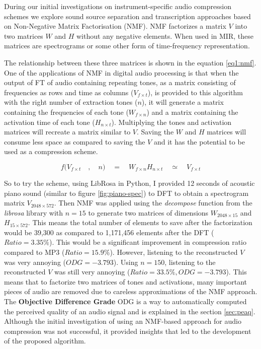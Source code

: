 During our initial investigations on instrument-specific audio compression schemes we explore sound source 
separation and transcription approaches based on Non-Negative Matrix Factorisation (NMF). NMF factorizes a matrix $V$ into two matrices $W$ and $H$ without any negative elements. When used in MIR, these matrices are spectrograms or some other form of time-frequency representation. 

The relationship between these three matrices is shown in the equation \ref{eq1:nmf}. One of the applications of NMF in digital audio processing is that when the output of FT of audio containing repeating tones, as a matrix consisting of frequencies as rows and time as columns ($V_{f\times t}$), is provided to this algorithm with the right number of extraction tones ($n$), it will generate a matrix containing the frequencies of each tone ($W_{f\times n}$) and a matrix containing the activation time of each tone ($H_{n\times t}$). Multiplying the tones and activation matrices will recreate a matrix similar to $V$. Saving the $W$ and $H$ matrices will consume less space as compared to saving the $V$ and it has the potential to be used as a compression scheme.

\begin{equation} 
\label{eq1:nmf}
f\big(V_{f\times t}\quad,\quad n\big)\quad=\quad W_{f\times n} H_{n\times t} \quad\simeq\quad V_{f\times t}
\end{equation}

So to try the scheme, using LibRosa in Python\cite{mcfee2015librosa}, I provided 12 seconds of acoustic piano sound (similar to figure \ref{fig:piano-spec}) to DFT to obtain a spectrogram matrix $V_{2048\times 572}$. Then NMF was applied using the {\it decompose} function from the {\it librosa} library with $n=15$ 
to generate two matrices of dimensions $W_{2048\times 15}$ and $H_{15\times 572}$. This means the total number of elements to save after the factorization would be 39,300 as compared to 1,171,456 elements after the DFT ($Ratio=3.35\%$). This would be a significant improvement in compression ratio compared to MP3 ($Ratio=15.9\%$). However, listening to the reconstructed $V$ was very annoying ($ODG=-3.793$). Using $n=150$, listening to the reconstructed $V$ was still very annoying ($Ratio=33.5\%, ODG=-3.793$). This means that to factorize two matrices of tones and activations, many important pieces of audio are removed due to careless approximations of the NMF approach.
The {\bf Objective Difference Grade} ODG is a way to 
automatically computed the perceived quality of an audio signal and is explained in the section \ref{sec:peaq}. 
Although the initial investigation of using an NMF-based approach for audio compression was not successful, it provided insights that led to the development of the proposed algorithm. 

